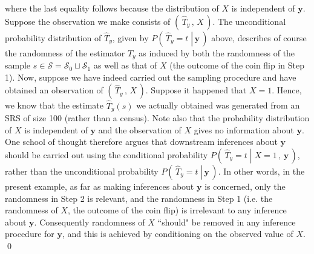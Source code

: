 \documentclass{article}
\begin{document}
where the last equality follows because the distribution of $X$ is independent of $\mathbf{y}$.
Suppose the observation we make consists of $\left(\,\widehat{T}_{y}\,,\,X\,\right)$.
The unconditional probability distribution of $\widehat{T}_{y}$,
given by $P\left(\,\left.\widehat{T}_{y} = t\;\right\vert\,\mathbf{y}\,\right)$ above,
describes of course the randomness of the estimator $\widehat{T}_{y}$ as induced
by both the randomness of the sample
$s \in \mathcal{S} = \mathcal{S}_{0} \sqcup \mathcal{S}_{1}$
as well as that of $X$ (the outcome of the coin flip in Step 1).
Now, suppose we have indeed carried out the sampling procedure and have obtained
an observation of $\left(\,\widehat{T}_{y}\,,\,X\,\right)$.
Suppose it happened that $X = 1$.
Hence, we know that the estimate $\widehat{T}_{y}(s)$ we actually obtained
was generated from an SRS of size 100 (rather than a census).
Note also that the probability distribution of $X$ is independent of $\mathbf{y}$
and the observation of $X$ gives no information about $\mathbf{y}$.
{\color{red}One school of thought therefore argues that downstream inferences
about $\mathbf{y}$ should be carried out using the conditional probability
$P\!\left(\,\left.\widehat{T}_{y} = t\;\right\vert\;X = 1\,,\,\mathbf{y}\,\right)$,
rather than the unconditional probability
$P\left(\,\left.\widehat{T}_{y} = t\;\right\vert\,\mathbf{y}\,\right)$.}
In other words, in the present example, as far as making inferences about $\mathbf{y}$
is concerned, only the randomness in Step 2 is relevant, and the randomness in Step 1
(i.e. the randomness of $X$, the outcome of the coin flip) is irrelevant to any inference
about $\mathbf{y}$. Consequently randomness of $X$ ``should" be removed in any
inference procedure for $\mathbf{y}$, and this is achieved by conditioning on the
observed value of $X$. \qed
\end{document}
